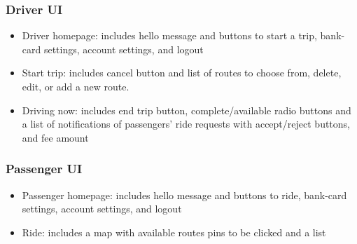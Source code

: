 \documentclass{BusMateSRS}
\begin{document}
\subsubsection{Driver UI}
\begin{itemize}
  \item Driver homepage: 
    includes hello message and buttons to start a trip, bank-card settings, 
    account settings, and logout
  \item Start trip:
    includes cancel button and list of routes to choose from, delete, edit, 
    or add a new route.
  \item Driving now:
    includes end trip button, complete/available radio buttons and 
    a list of notifications of passengers' 
    ride requests with accept/reject buttons, and fee amount
\end{itemize}

\subsubsection{Passenger UI}
\begin{itemize}
  \item Passenger homepage:
    includes hello message and buttons to ride, bank-card settings, 
    account settings, and logout
  \item Ride: 
    includes a map with available routes pins to be clicked and a list
\end{itemize}
\end{document}
